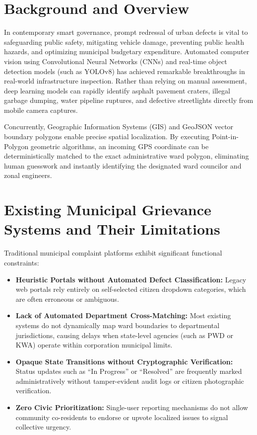 \documentclass[12pt,a4paper]{report}
\begin{document}
\section{Background and Overview}
In contemporary smart governance, prompt redressal of urban defects is vital to safeguarding public safety, mitigating vehicle damage, preventing public health hazards, and optimizing municipal budgetary expenditure. Automated computer vision using Convolutional Neural Networks (CNNs) and real-time object detection models (such as YOLOv8) has achieved remarkable breakthroughs in real-world infrastructure inspection. Rather than relying on manual assessment, deep learning models can rapidly identify asphalt pavement craters, illegal garbage dumping, water pipeline ruptures, and defective streetlights directly from mobile camera captures.

Concurrently, Geographic Information Systems (GIS) and GeoJSON vector boundary polygons enable precise spatial localization. By executing Point-in-Polygon geometric algorithms, an incoming GPS coordinate can be deterministically matched to the exact administrative ward polygon, eliminating human guesswork and instantly identifying the designated ward councilor and zonal engineers.

\section{Existing Municipal Grievance Systems and Their Limitations}
Traditional municipal complaint platforms exhibit significant functional constraints:
\begin{itemize}
    \item \textbf{Heuristic Portals without Automated Defect Classification:} Legacy web portals rely entirely on self-selected citizen dropdown categories, which are often erroneous or ambiguous.
    \item \textbf{Lack of Automated Department Cross-Matching:} Most existing systems do not dynamically map ward boundaries to departmental jurisdictions, causing delays when state-level agencies (such as PWD or KWA) operate within corporation municipal limits.
    \item \textbf{Opaque State Transitions without Cryptographic Verification:} Status updates such as ``In Progress'' or ``Resolved'' are frequently marked administratively without tamper-evident audit logs or citizen photographic verification.
    \item \textbf{Zero Civic Prioritization:} Single-user reporting mechanisms do not allow community co-residents to endorse or upvote localized issues to signal collective urgency.
\end{itemize}
\end{document}
